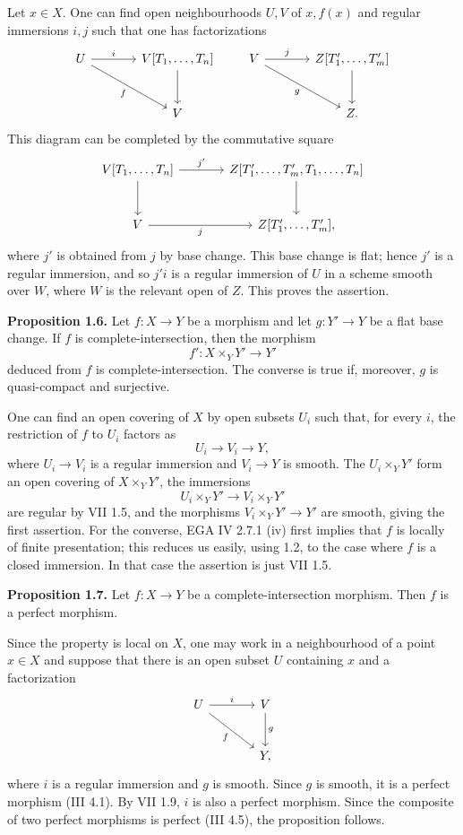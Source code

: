 Let $x\in X$. One can find open neighbourhoods $U,V$ of $x,f(x)$ and regular immersions $i,j$ such that one has factorizations
\[
\begin{tikzcd}[column sep=large,row sep=large]
U \arrow[r,"i"] \arrow[dr,"f"'] & V[T_1,\ldots,T_n] \arrow[d]\\
& V
\end{tikzcd}
\qquad
\begin{tikzcd}[column sep=large,row sep=large]
V \arrow[r,"j"] \arrow[dr,"g"'] & Z[T'_1,\ldots,T'_m] \arrow[d]\\
& Z.
\end{tikzcd}
\]
This diagram can be completed by the commutative square
\[
\begin{tikzcd}[column sep=large,row sep=large]
V[T_1,\ldots,T_n] \arrow[r,"j'"] \arrow[d] & Z[T'_1,\ldots,T'_m,T_1,\ldots,T_n] \arrow[d]\\
V \arrow[r,"j"'] & Z[T'_1,\ldots,T'_m],
\end{tikzcd}
\]
where $j'$ is obtained from $j$ by base change. This base change is flat; hence $j'$ is a regular immersion, and so $j'i$ is a regular immersion of $U$ in a scheme smooth over $W$, where $W$ is the relevant open of $Z$. This proves the assertion.

\textbf{Proposition 1.6.} Let $f:X\to Y$ be a morphism and let $g:Y'\to Y$ be a flat base change. If $f$ is complete-intersection, then the morphism
\[
f':X\times_Y Y'\longrightarrow Y'
\]
deduced from $f$ is complete-intersection. The converse is true if, moreover, $g$ is quasi-compact and surjective.

One can find an open covering of $X$ by open subsets $U_i$ such that, for every $i$, the restriction of $f$ to $U_i$ factors as
\[
U_i\longrightarrow V_i\longrightarrow Y,
\]
where $U_i\to V_i$ is a regular immersion and $V_i\to Y$ is smooth. The $U_i\times_Y Y'$ form an open covering of $X\times_Y Y'$, the immersions
\[
U_i\times_Y Y'\longrightarrow V_i\times_Y Y'
\]
are regular by VII 1.5, and the morphisms $V_i\times_Y Y'\to Y'$ are smooth, giving the first assertion. For the converse, EGA IV 2.7.1 (iv) first implies that $f$ is locally of finite presentation; this reduces us easily, using 1.2, to the case where $f$ is a closed immersion. In that case the assertion is just VII 1.5.

\textbf{Proposition 1.7.} Let $f:X\to Y$ be a complete-intersection morphism. Then $f$ is a perfect morphism.

Since the property is local on $X$, one may work in a neighbourhood of a point $x\in X$ and suppose that there is an open subset $U$ containing $x$ and a factorization
\[
\begin{tikzcd}[column sep=large,row sep=large]
U \arrow[r,"i"] \arrow[dr,"f"'] & V \arrow[d,"g"]\\
& Y,
\end{tikzcd}
\]
where $i$ is a regular immersion and $g$ is smooth. Since $g$ is smooth, it is a perfect morphism (III 4.1). By VII 1.9, $i$ is also a perfect morphism. Since the composite of two perfect morphisms is perfect (III 4.5), the proposition follows.

